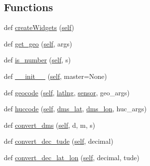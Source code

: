 \subsection*{Functions}
\begin{DoxyCompactItemize}
\item 
def \hyperlink{namespaceget__geo___h_u_c_a00508deb9e21d5ff5be209dada8cb9fd}{create\+Widgets} (\hyperlink{namespaceget__geo___h_u_c_a5d34137420af63fc8dd32374dead14a8}{self})
\item 
def \hyperlink{namespaceget__geo___h_u_c_a400d7645bf5f9b8f5a07cd60f749d1b7}{get\+\_\+geo} (\hyperlink{namespaceget__geo___h_u_c_a5d34137420af63fc8dd32374dead14a8}{self}, args)
\item 
def \hyperlink{namespaceget__geo___h_u_c_a4d0dce07eab2a159ef5d04e0742d5e03}{is\+\_\+number} (\hyperlink{namespaceget__geo___h_u_c_a5d34137420af63fc8dd32374dead14a8}{self}, s)
\item 
def \hyperlink{namespaceget__geo___h_u_c_a4464d7f0ff14cfe91f0b14a490327af9}{\+\_\+\+\_\+init\+\_\+\+\_\+} (\hyperlink{namespaceget__geo___h_u_c_a5d34137420af63fc8dd32374dead14a8}{self}, master=None)
\item 
def \hyperlink{namespaceget__geo___h_u_c_ab68d25f6902e2500c520513afb9253f2}{geocode} (\hyperlink{namespaceget__geo___h_u_c_a5d34137420af63fc8dd32374dead14a8}{self}, \hyperlink{namespaceget__geo___h_u_c_acafcc8295c3d6a0de2fb561809cca132}{latlng}, \hyperlink{namespaceget__geo___h_u_c_abd10e556b8081f3cd80bff1a987455af}{sensor}, geo\+\_\+args)
\item 
def \hyperlink{namespaceget__geo___h_u_c_ad7a7e36924d7182d2e06569e3abb5ea7}{huccode} (\hyperlink{namespaceget__geo___h_u_c_a5d34137420af63fc8dd32374dead14a8}{self}, \hyperlink{namespaceget__geo___h_u_c_ac22be281ee4954369c420f4045ec3336}{dms\+\_\+lat}, \hyperlink{namespaceget__geo___h_u_c_a3db416386a0a3ae6cf4b30fab0f65118}{dms\+\_\+lon}, huc\+\_\+args)
\item 
def \hyperlink{namespaceget__geo___h_u_c_ace8718ec9f6ab42ef73d183f38576100}{convert\+\_\+dms} (\hyperlink{namespaceget__geo___h_u_c_a5d34137420af63fc8dd32374dead14a8}{self}, d, m, s)
\item 
def \hyperlink{namespaceget__geo___h_u_c_a79b57d5406de0fef5ee616514de74584}{convert\+\_\+dec\+\_\+tude} (\hyperlink{namespaceget__geo___h_u_c_a5d34137420af63fc8dd32374dead14a8}{self}, decimal)
\item 
def \hyperlink{namespaceget__geo___h_u_c_a25d58c7f5b75b8d09a4738ec01a0e312}{convert\+\_\+dec\+\_\+lat\+\_\+lon} (\hyperlink{namespaceget__geo___h_u_c_a5d34137420af63fc8dd32374dead14a8}{self}, decimal, tude)
\end{DoxyCompactItemize}
